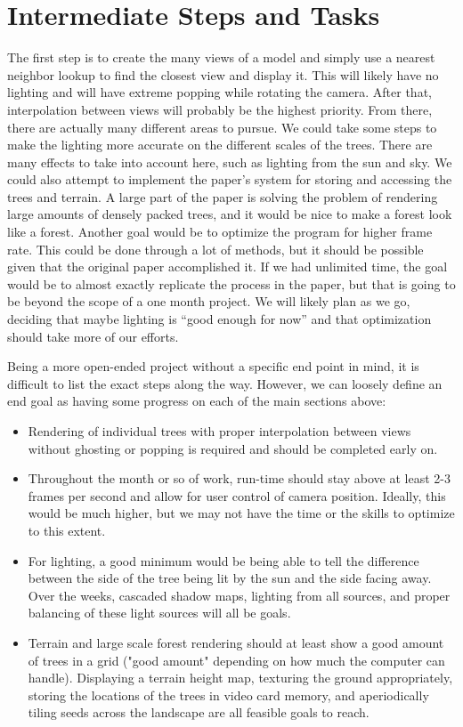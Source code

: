 \documentclass{article}
\begin{document}
\section{Intermediate Steps and Tasks}
The first step is to create the many views of a model and simply use a nearest neighbor lookup to find the closest view and display it. This will likely have no lighting and will have extreme popping while rotating the camera. 
After that, interpolation between views will probably be the highest priority. 
From there, there are actually many different areas to pursue. We could take some steps to make the lighting more accurate on the different scales of the trees. There are many effects to take into account here, such as lighting from the sun and sky. 
We could also attempt to implement the paper's system for storing and accessing the trees and terrain. A large part of the paper is solving the problem of rendering large amounts of densely packed trees, and it would be nice to make a forest look like a forest. 
Another goal would be to optimize the program for higher frame rate. This could be done through a lot of methods, but it should be possible given that the original paper accomplished it. 
If we had unlimited time, the goal would be to almost exactly replicate the process in the paper, but that is going to be beyond the scope of a one month project. We will likely plan as we go, deciding that maybe lighting is ``good enough for now'' and that optimization should take more of our efforts.


Being a more open-ended project without a specific end point in mind, it is difficult to list the exact steps along the way. However, we can loosely define an end goal as having some progress on each of the main sections above:

\begin {itemize}
\item Rendering of individual trees with proper interpolation between views without ghosting or popping is required and should be completed early on.

\item Throughout the month or so of work, run-time should stay above at least 2-3 frames per second and allow for user control of camera position. Ideally, this would be much higher, but we may not have the time or the skills to optimize to this extent.

\item For lighting, a good minimum would be being able to tell the difference between the side of the tree being lit by the sun and the side facing away. Over the weeks, cascaded shadow maps, lighting from all sources, and proper balancing of these light sources will all be goals.

\item Terrain and large scale forest rendering should at least show a good amount of trees in a grid ("good amount" depending on how much the computer can handle). Displaying a terrain height map, texturing the ground appropriately, storing the locations of the trees in video card memory, and aperiodically tiling seeds across the landscape are all feasible goals to reach.

\end {itemize}
\end{document}

